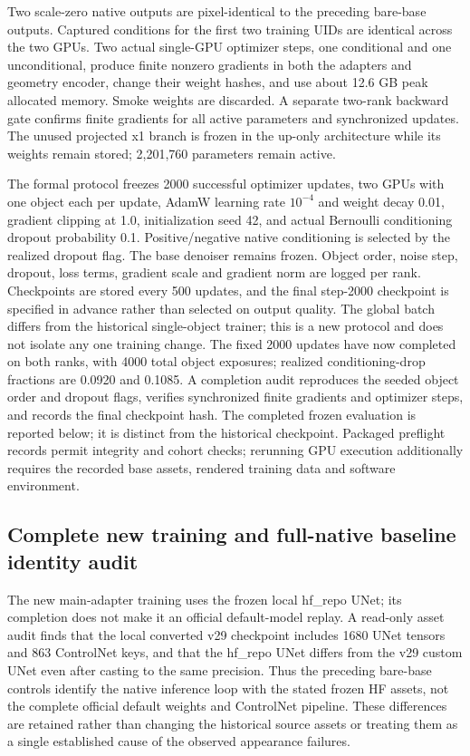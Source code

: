 \documentclass[11pt]{article}
\begin{document}
Two scale-zero native outputs are pixel-identical to the preceding bare-base outputs. Captured conditions for the first two training UIDs are identical across the two GPUs. Two actual single-GPU optimizer steps, one conditional and one unconditional, produce finite nonzero gradients in both the adapters and geometry encoder, change their weight hashes, and use about 12.6 GB peak allocated memory. Smoke weights are discarded. A separate two-rank backward gate confirms finite gradients for all active parameters and synchronized updates. The unused projected x1 branch is frozen in the up-only architecture while its weights remain stored; 2,201,760 parameters remain active.

The formal protocol freezes 2000 successful optimizer updates, two GPUs with one object each per update, AdamW learning rate $10^{-4}$ and weight decay 0.01, gradient clipping at 1.0, initialization seed 42, and actual Bernoulli conditioning dropout probability 0.1. Positive/negative native conditioning is selected by the realized dropout flag. The base denoiser remains frozen. Object order, noise step, dropout, loss terms, gradient scale and gradient norm are logged per rank. Checkpoints are stored every 500 updates, and the final step-2000 checkpoint is specified in advance rather than selected on output quality. The global batch differs from the historical single-object trainer; this is a new protocol and does not isolate any one training change. The fixed 2000 updates have now completed on both ranks, with 4000 total object exposures; realized conditioning-drop fractions are 0.0920 and 0.1085. A completion audit reproduces the seeded object order and dropout flags, verifies synchronized finite gradients and optimizer steps, and records the final checkpoint hash. The completed frozen evaluation is reported below; it is distinct from the historical checkpoint. Packaged preflight records permit integrity and cohort checks; rerunning GPU execution additionally requires the recorded base assets, rendered training data and software environment.

\subsection*{Complete new training and full-native baseline identity audit}
The new main-adapter training uses the frozen local hf\_repo UNet; its completion does not make it an official default-model replay. A read-only asset audit finds that the local converted v29 checkpoint includes 1680 UNet tensors and 863 ControlNet keys, and that the hf\_repo UNet differs from the v29 custom UNet even after casting to the same precision. Thus the preceding bare-base controls identify the native inference loop with the stated frozen HF assets, not the complete official default weights and ControlNet pipeline. These differences are retained rather than changing the historical source assets or treating them as a single established cause of the observed appearance failures.
\end{document}

